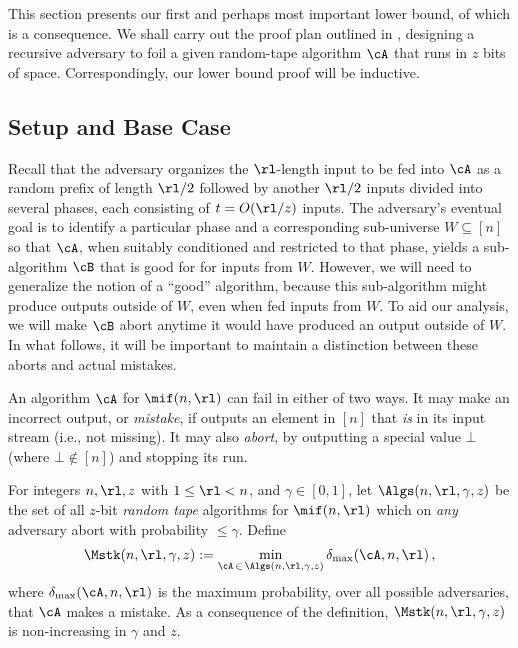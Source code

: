 \begin{itemize}
\begin{itemize}
This section presents our first and perhaps most important lower bound, of
which  is a consequence. We shall carry out the proof plan
outlined in , designing a recursive adversary to
foil a given random-tape \mif algorithm $\cA$ that runs in $z$ bits of space.
Correspondingly, our lower bound proof will be inductive.

\subsection{Setup and Base Case}

Recall that the adversary organizes the $\rl$-length input to be fed into
$\cA$ as a random prefix of length $\rl/2$ followed by another $\rl/2$ inputs
divided into several phases, each consisting of $t = O(\rl/z)$ inputs. The
adversary's eventual goal is to identify a particular phase and a
corresponding sub-universe $W \subseteq [n]$ so that $\cA$, when suitably
conditioned and restricted to that phase, yields a sub-algorithm $\cB$ that is
good for \mif for inputs from $W$. However, we will need to generalize the notion of a
``good'' \mif algorithm, because this sub-algorithm might produce outputs outside of $W$,
even when fed inputs from $W$. To aid our analysis, we will make $\cB$ abort
anytime it would have produced an output outside of $W$. In what follows, it
will be important to maintain a distinction between these aborts and actual
mistakes.

\begin{definition}\label{def:mif-rt-err-complexity}
  An algorithm $\cA$ for $\mif(n,\rl)$ can fail in either of two ways. It may
  make an incorrect output, or {\em mistake}, if outputs an element in $[n]$
  that {\em is} in its input stream (i.e., not missing). It may also {\em
  abort}, by outputting a special value $\bot$ (where $\bot \notin [n]$)
  and stopping its run.
 
  For integers $n,\rl,z$ with $1 \le \rl < n$, and $\gamma \in [0,1]$, let
  $\Algs(n,\rl,\gamma,z)$ be the set of all $z$-bit \emph{random tape}
  algorithms for $\mif(n,\rl)$ which on \emph{any} adversary abort
  with probability $\le \gamma$. Define
  \begin{align*}
    \Mstk(n,\rl,\gamma,z) := \min_{\cA \,\in\, \Algs(n,\rl,\gamma,z)} 
      \delta_{\max}(\cA, n,\rl) \,,
  \end{align*}
  where $\delta_{\max}(\cA, n,\rl)$ is the maximum probability, over all
  possible adversaries, that $\cA$ makes a mistake. As a consequence of the
  definition, $\Mstk(n,\rl,\gamma,z)$ is non-increasing in $\gamma$ and $z$.
\end{definition}


\end{itemize}
\end{itemize}
